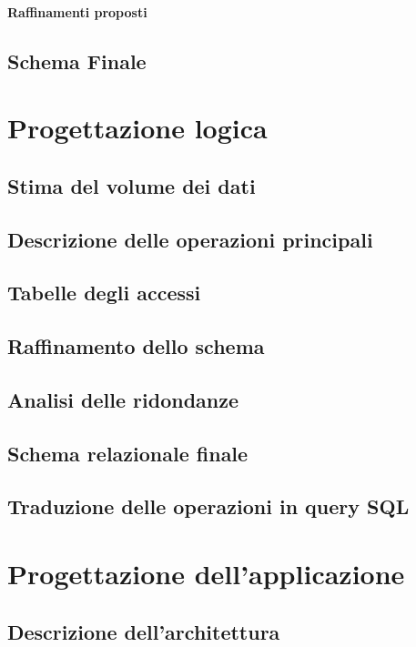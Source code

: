 \documentclass[a4paper,12pt]{report}
\begin{document}
\subsubsection{Raffinamenti proposti}
\section{Schema Finale}

\chapter{Progettazione logica}
\section{Stima del volume dei dati}
\section{Descrizione delle operazioni principali}
\section{Tabelle degli accessi}
\section{Raffinamento dello schema}
\section{Analisi delle ridondanze}
\section{Schema relazionale finale}
\section{Traduzione delle operazioni in query SQL}

\chapter{Progettazione dell'applicazione}
\section{Descrizione dell'architettura}



\end{document}
